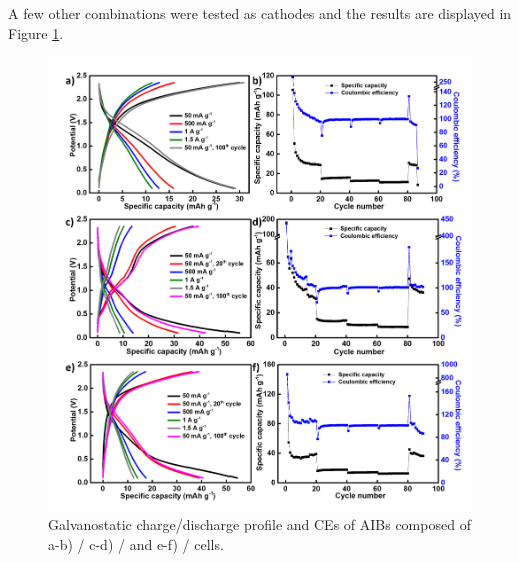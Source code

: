 A few other combinations were tested as cathodes and the results are displayed in Figure \ref{Figures/BOhBN:othON}.

\begin{figure}[tbh!]
\centering
\includegraphics[width=\textwidth]{Figures/BOhBN/othON}
\caption{Galvanostatic charge/discharge profile and CEs of AIBs composed of a-b) / c-d) / and e-f) / cells.}
\label{Figures/BOhBN:othON}
\end{figure}

